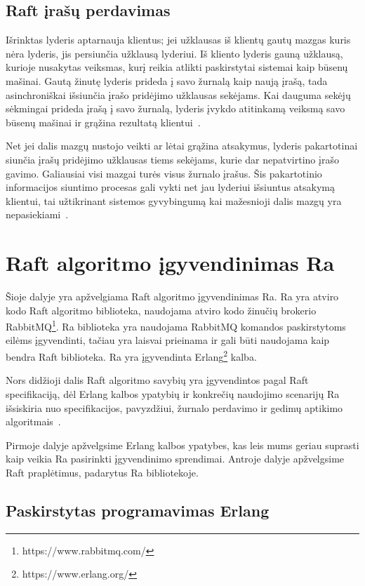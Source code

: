 \documentclass{VUMIFPSkursinis}
\begin{document}
\subsection{Raft įrašų perdavimas}

Išrinktas lyderis aptarnauja klientus; jei užklausas iš klientų gautų mazgas kuris nėra lyderis, jis persiunčia užklausą lyderiui. Iš kliento lyderis gauną užklausą, kurioje nusakytas veiksmas, kurį reikia atlikti paskirstytai sistemai kaip būsenų mašinai. Gautą žinutę lyderis prideda į savo žurnalą kaip naują įrašą, tada asinchroniškai išsiunčia įrašo pridėjimo užklausas sekėjams. Kai dauguma sekėjų sėkmingai prideda įrašą į savo žurnalą, lyderis įvykdo atitinkamą veiksmą savo būsenų mašinai ir grąžina rezultatą klientui~\cite{ongaro_consensus}. 

Net jei dalis mazgų nustojo veikti ar lėtai grąžina atsakymus, lyderis pakartotinai siunčia įrašų pridėjimo užklausas tiems sekėjams, kurie dar nepatvirtino įrašo gavimo. Galiausiai visi mazgai turės visus žurnalo įrašus. Šis pakartotinio informacijos siuntimo procesas gali vykti net jau lyderiui išsiuntus atsakymą klientui, tai užtikrinant sistemos gyvybingumą kai mažesnioji dalis mazgų yra nepasiekiami~\cite{ongaro_consensus}.

\section{Raft algoritmo įgyvendinimas Ra}

Šioje dalyje yra apžvelgiama Raft algoritmo įgyvendinimas Ra. Ra yra atviro kodo Raft algoritmo biblioteka, naudojama atviro kodo žinučių brokerio RabbitMQ\footnote{https://www.rabbitmq.com/}. Ra biblioteka yra naudojama RabbitMQ komandos paskirstytoms eilėms įgyvendinti, tačiau yra laisvai prieinama ir gali būti naudojama kaip bendra Raft biblioteka. Ra yra įgyvendinta Erlang\footnote{https://www.erlang.org/} kalba.

Nors didžioji dalis Raft algoritmo savybių yra įgyvendintos pagal Raft specifikaciją, dėl Erlang kalbos ypatybių ir konkrečių naudojimo scenarijų Ra išsiskiria nuo specifikacijos, pavyzdžiui, žurnalo perdavimo ir gedimų aptikimo algoritmais~\cite{rabbitmqra}.

Pirmoje dalyje apžvelgsime Erlang kalbos ypatybes, kas leis mums geriau suprasti kaip veikia Ra pasirinkti įgyvendinimo sprendimai. Antroje dalyje apžvelgsime Raft praplėtimus, padarytus Ra bibliotekoje.

\subsection{Paskirstytas programavimas Erlang}
\end{document}
